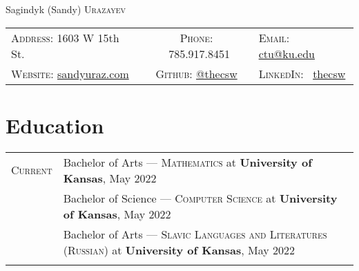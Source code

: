 \documentclass[a4paper, 10pt]{article}
\begin{document}
\pagestyle{empty}
\enlargethispage{\baselineskip}

\par{\centering
	{\Huge Sagindyk (Sandy) \textsc{Urazayev}
	}\smallskip\par}

\begin{center}
	\begin{tabular}{lcl}
		\textsc{Address:}   1603 W 15th St.                              &
		\textsc{Phone:} \quad \ 785.917.8451                             &
		\textsc{Email:} \quad \href{mailto:ctu@ku.edu}{ctu@ku.edu}         \\

		\textsc{Website:} \href{https://sandyuraz.com}{sandyuraz.com}    &
		\textsc{Github:} \quad \href{https://github.com/thecsw}{@thecsw} &
		\textsc{LinkedIn:} \ \href{https://linkedin.com/in/thecsw}{thecsw} \\
	\end{tabular}
\end{center}

\section{Education}
\begin{tabular}{rl}
	\textsc{Current} & Bachelor of Arts --- \textsc{Mathematics} at \normalsize\textbf{University of Kansas}, May 2022         \\
	                 & Bachelor of Science --- \textsc{Computer Science} at \normalsize\textbf{University of Kansas}, May 2022 \\
	                 & Bachelor of Arts --- \textsc{Slavic Languages and Literatures (Russian)} at \normalsize\textbf{University of Kansas}, May 2022         \\

	\\
\end{tabular}
\end{document}
